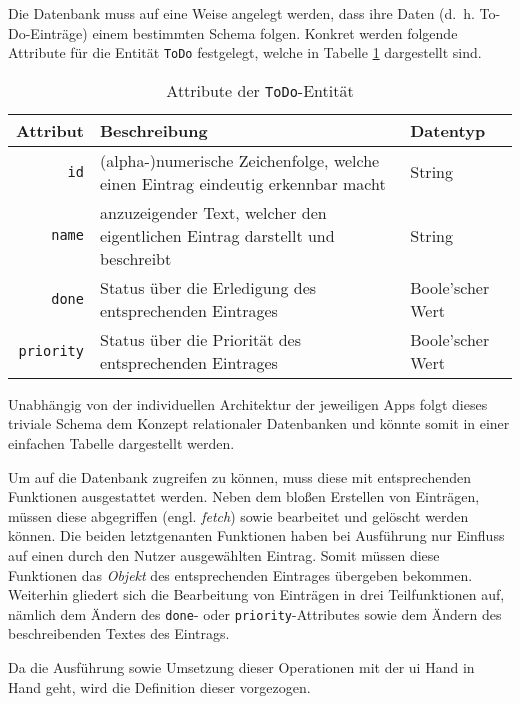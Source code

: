 Die Datenbank muss auf eine Weise angelegt werden, dass ihre Daten (d.\ h. To-Do-Einträge) einem bestimmten Schema folgen. Konkret werden folgende Attribute für die Entität \texttt{ToDo} festgelegt, welche in Tabelle \ref{tab:entity} dargestellt sind.

{\setlength{\extrarowheight}{3pt}%
\begin{table}[h!]
	\centering
	\begin{tabular}{r|>{\arraybackslash}p{9cm}|l}
		\textbf{Attribut} & \textbf{Beschreibung} & \textbf{Datentyp} \\ \hline 
		\texttt{id}          & (alpha-)numerische Zeichenfolge, welche einen Eintrag eindeutig erkennbar macht                    & String   \\
		\texttt{name}            & anzuzeigender Text, welcher den eigentlichen Eintrag darstellt und beschreibt                   & String                              \\
		\texttt{done}   & Status über die Erledigung des entsprechenden Eintrages                    & Boole'scher Wert \\
		\texttt{priority}   & Status über die Priorität des entsprechenden Eintrages                    & Boole'scher Wert \\                                  
	\end{tabular}
	\caption{Attribute der \texttt{ToDo}-Entität} \label{tab:entity}
\end{table}
}


Unabhängig von der individuellen Architektur der jeweiligen Apps folgt dieses triviale Schema dem Konzept relationaler Datenbanken und könnte somit in einer einfachen Tabelle dargestellt werden.

Um auf die Datenbank zugreifen zu können, muss diese mit entsprechenden Funktionen ausgestattet werden. Neben dem bloßen Erstellen von Einträgen, müssen diese abgegriffen (engl. \textit{fetch}) sowie bearbeitet und gelöscht werden können. Die beiden letztgenanten Funktionen haben bei Ausführung nur Einfluss auf einen durch den Nutzer ausgewählten Eintrag. Somit müssen diese Funktionen das \textit{Objekt} des entsprechenden Eintrages übergeben bekommen. Weiterhin gliedert sich die Bearbeitung von Einträgen in drei Teilfunktionen auf, nämlich dem Ändern des \texttt{done}- oder \texttt{priority}-Attributes sowie dem Ändern des beschreibenden Textes des Eintrags.

Da die Ausführung sowie Umsetzung dieser Operationen mit der \ac{ui} Hand in Hand geht, wird die Definition dieser vorgezogen.
